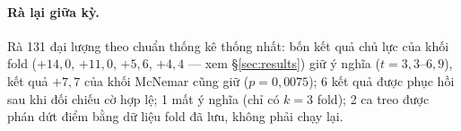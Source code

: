 \paragraph{Rà lại giữa kỳ.} Rà 131 đại lượng theo chuẩn thống kê thống nhất: bốn kết quả chủ
lực của khối fold ($+14{,}0$, $+11{,}0$, $+5{,}6$, $+4{,}4$ --- xem \S\ref{sec:results}) giữ ý
nghĩa ($t=3{,}3$--$6{,}9$), kết quả $+7{,}7$ của khối McNemar cũng giữ ($p=0{,}0075$); 6 kết
quả được phục hồi sau khi đối chiếu cờ hợp lệ; 1 mất ý nghĩa (chỉ có $k{=}3$ fold); 2 ca treo
được phán dứt điểm bằng dữ liệu fold đã lưu, không phải chạy lại.

